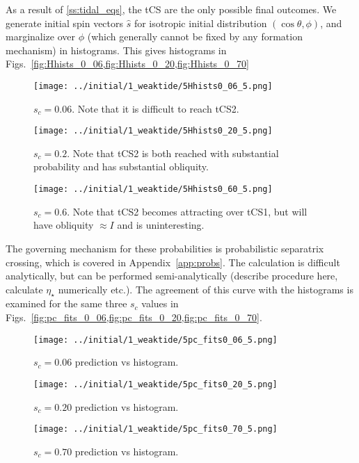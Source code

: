 \documentclass[
        fleqn,
        usenatbib,
        referee,
    ]{mnras}
\newcommand*{\p}[1]{\left(#1\right)}
\begin{document}
As a result of \autoref{ss:tidal_eqs}, the tCS are the only possible final
outcomes. We generate initial spin vectors $\hat{s}$ for isotropic initial
distribution $\p{\cos \theta, \phi}$, and marginalize over $\phi$ (which
generally cannot be fixed by any formation mechanism) in histograms. This gives
histograms in Figs.~\ref{fig:Hhists_0_06,fig:Hhists_0_20,fig:Hhists_0_70}
\begin{figure}
    \centering
    \texttt{[image: ../initial/1\_weaktide/5Hhists0\_06\_5.png]}
    \caption{$s_c = 0.06$. Note that it is difficult to reach
    tCS2.}\label{fig:Hhists_0_06}
\end{figure}
\begin{figure}
    \centering
    \texttt{[image: ../initial/1\_weaktide/5Hhists0\_20\_5.png]}
    \caption{$s_c = 0.2$. Note that tCS2 is both reached with substantial
    probability and has substantial obliquity.}\label{fig:Hhists_0_20}
\end{figure}
\begin{figure}
    \centering
    \texttt{[image: ../initial/1\_weaktide/5Hhists0\_60\_5.png]}
    \caption{$s_c = 0.6$. Note that tCS2 becomes attracting over tCS1, but will
    have obliquity $\approx I$ and is uninteresting.}\label{fig:Hhists_0_70}
\end{figure}

The governing mechanism for these probabilities is probabilistic separatrix
crossing, which is covered in Appendix~\ref{app:probs}. The calculation is
difficult analytically, but can be performed semi-analytically (describe
procedure here, calculate $\eta_{\star}$ numerically etc.). The agreement of
this curve with the histograms is examined for the same three $s_c$ values
in Figs.~\ref{fig:pc_fits_0_06,fig:pc_fits_0_20,fig:pc_fits_0_70}.
\begin{figure}
    \centering
    \texttt{[image: ../initial/1\_weaktide/5pc\_fits0\_06\_5.png]}
    \caption{$s_c = 0.06$ prediction vs histogram.}\label{fig:pc_fits_0_06}
\end{figure}
\begin{figure}
    \centering
    \texttt{[image: ../initial/1\_weaktide/5pc\_fits0\_20\_5.png]}
    \caption{$s_c = 0.20$ prediction vs histogram.}\label{fig:pc_fits_0_20}
\end{figure}
\begin{figure}
    \centering
    \texttt{[image: ../initial/1\_weaktide/5pc\_fits0\_70\_5.png]}
    \caption{$s_c = 0.70$ prediction vs histogram.}\label{fig:pc_fits_0_70}
\end{figure}
\end{document}
